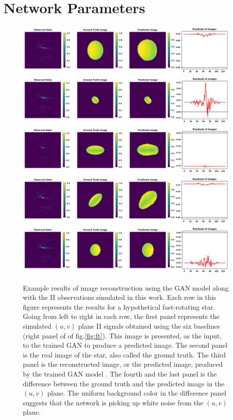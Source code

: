 \section{Network Parameters}
\begin{figure}
	\centering
	\includegraphics[width=\linewidth]{fig/testing_image/image_7.png}
	\includegraphics[width=\linewidth]{fig/testing_image/image_12.png}
	\includegraphics[width=\linewidth]{fig/testing_image/image_13.png}
	\includegraphics[width=\linewidth]{fig/testing_image/image_29.png}
	\includegraphics[width=\linewidth]{fig/testing_image/image_39.png}
\caption{Example results of image reconstruction using the GAN model along with the II observations simulated in this work. Each row in this figure represents the results for a hypothetical fast-rotating star. Going from left to right in each row, the first panel represents the simulated $(u,v)$ plane II signals obtained using the six baselines (right panel of of fig.\ref{fig:ft}). This image is presented, as the input, to the trained GAN to produce a predicted image. The second panel is the real image of the star, also called the ground truth. The third panel is the reconstructed image, or the predicted image, produced by the trained GAN model . The fourth and the last panel is the difference between the ground truth and the predicted image in the $(u,v)$ plane. The uniform background color in the difference panel suggests that the network is picking up white noise from the $(u,v)$ plane. }
	\label{fig:GAN}
\end{figure}
